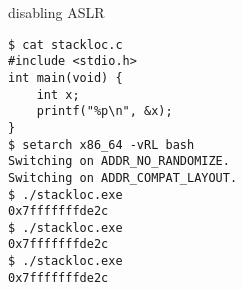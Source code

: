 
\begin{frame}[fragile,label=stackLoc2]{disabling ASLR}
\begin{Verbatim}[fontsize=\fontsize{9}{10}\selectfont]
$ cat stackloc.c
#include <stdio.h>
int main(void) {
    int x;
    printf("%p\n", &x);
}
$ setarch x86_64 -vRL bash
Switching on ADDR_NO_RANDOMIZE.
Switching on ADDR_COMPAT_LAYOUT.
$ ./stackloc.exe 
0x7fffffffde2c
$ ./stackloc.exe 
0x7fffffffde2c
$ ./stackloc.exe 
0x7fffffffde2c
\end{Verbatim}
\end{frame}

